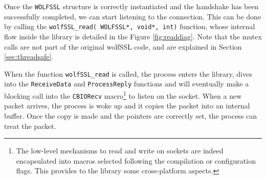 Once the \texttt{WOLFSSL} structure is correctly instantiated and the handshake has been successfully completed, we can start listening to the connection. This can be done by calling the \texttt{wolfSSL\_read( WOLFSSL*, void*, int)} function, whose internal flow inside the library is detailed in the Figure \ref{fig:readdiag}. Note that the mutex calls are not part of the original wolfSSL code, and are explained in Section \ref{sec:threadsafe}.

When the function \texttt{wolfSSL\_read} is called, the process enters the library, dives into the \texttt{ReceiveData} and \texttt{ProcessReply} functions and will eventually make a blocking call into the \texttt{CBIORecv} macro\footnote{The low-level mechanisms to read and write on sockets are indeed encapsulated into macros selected following the compilation or configuration flags. This provides to the library some cross-platform aspects.} to listen on the socket. When a new packet arrives, the process is woke up and it copies the packet into an internal buffer. Once the copy is made and the pointers are correctly set, the process can treat the packet.

